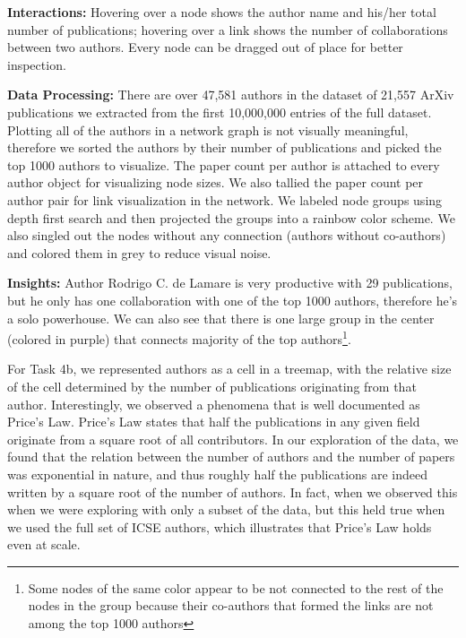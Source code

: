 \documentclass{article}
\begin{document}
\textbf{Interactions:} Hovering over a node shows the author name and his/her total number of publications; hovering over a link shows the number of collaborations between two authors. Every node can be dragged out of place for better inspection.

\textbf{Data Processing:} There are over 47,581 authors in the dataset of 21,557 ArXiv publications we extracted from the first 10,000,000 entries of the full dataset. Plotting all of the authors in a network graph is not visually meaningful, therefore we sorted the authors by their number of publications and picked the top 1000 authors to visualize. The paper count per author is attached to every author object for visualizing node sizes. We also tallied the paper count per author pair for link visualization in the network. We labeled node groups using depth first search and then projected the groups into a rainbow color scheme. We also singled out the nodes without any connection (authors without co-authors) and colored them in grey to reduce visual noise.

\textbf{Insights:} Author Rodrigo C. de Lamare is very productive with 29 publications, but he only has one collaboration with one of the top 1000 authors, therefore he's a solo powerhouse. We can also see that there is one large group in the center (colored in purple) that connects majority of the top authors\footnote{Some nodes of the same color appear to be not connected to the rest of the nodes in the group because their co-authors that formed the links are not among the top 1000 authors}.

For Task 4b, we represented authors as a cell in a treemap, with the relative size of the cell determined by the number of publications originating from that author. Interestingly, we observed a phenomena that is well documented as Price's Law. Price's Law states that half the publications in any given field originate from a square root of all contributors. In our exploration of the data, we found that the relation between the number of authors and the number of papers was exponential in nature, and thus roughly half the publications are indeed written by a square root of the number of authors. In fact, when we observed this when we were exploring with only a subset of the data, but this held true when we used the full set of ICSE authors, which illustrates that Price's Law holds even at scale. 
\end{document}
